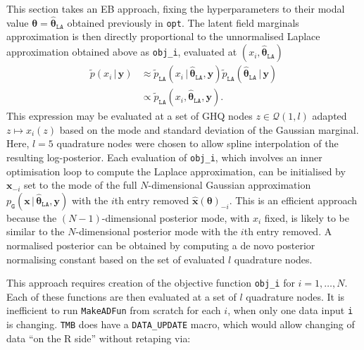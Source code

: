\documentclass[a4paper, nobind]{templates/ociamthesis}
\newenvironment{Shaded}{\begin{snugshade}}{\end{snugshade}}
\newcommand{\NormalTok}[1]{#1}
\newcommand{\OtherTok}[1]{\textcolor[rgb]{0.56,0.35,0.01}{#1}}
\newcommand{\SpecialCharTok}[1]{\textcolor[rgb]{0.81,0.36,0.00}{\textbf{#1}}}
\renewenvironment{Shaded}
{
  \vspace{10pt}%
  \begin{snugshade}%
}{%
  \end{snugshade}%
  \vspace{8pt}%
}
\begin{document}
This section takes an EB approach, fixing the hyperparameters to their modal value \(\boldsymbol{\mathbf{\theta}} = \hat{\boldsymbol{\mathbf{\theta}}}_\texttt{LA}\) obtained previously in \texttt{opt}.
The latent field marginals approximation is then directly proportional to the unnormalised Laplace approximation obtained above as \texttt{obj\_i}, evaluated at \((x_i, \hat{\boldsymbol{\mathbf{\theta}}}_\texttt{LA})\)
\begin{align}
\tilde p(x_i \, | \, \mathbf{y}) &\approx \tilde p_\texttt{LA}(x_i \, | \, \hat{\boldsymbol{\mathbf{\theta}}}_\texttt{LA}, \mathbf{y}) \tilde p_\texttt{LA}(\hat{\boldsymbol{\mathbf{\theta}}}_\texttt{LA} \, | \, \mathbf{y}) \\
&\propto \tilde p_\texttt{LA}(x_i, \hat{\boldsymbol{\mathbf{\theta}}}_\texttt{LA}, \mathbf{y}).
\end{align}
This expression may be evaluated at a set of GHQ nodes \(z \in \mathcal{Q}(1, l)\) adapted \(z \mapsto x_i(z)\) based on the mode and standard deviation of the Gaussian marginal.
Here, \(l = 5\) quadrature nodes were chosen to allow spline interpolation of the resulting log-posterior.
Each evaluation of \texttt{obj\_i}, which involves an inner optimisation loop to compute the Laplace approximation, can be initialised by \(\mathbf{x}_{-i}\) set to the mode of the full \(N\)-dimensional Gaussian approximation \(p_\texttt{G}(\mathbf{x} \, | \, \hat{\boldsymbol{\mathbf{\theta}}}_\texttt{LA}, \mathbf{y})\) with the \(i\)th entry removed \(\hat{\mathbf{x}}(\boldsymbol{\mathbf{\theta}})_{-i}\).
This is an efficient approach because the \((N - 1)\)-dimensional posterior mode, with \(x_i\) fixed, is likely to be similar to the \(N\)-dimensional posterior mode with the \(i\)th entry removed.
A normalised posterior can be obtained by computing a de novo posterior normalising constant based on the set of evaluated \(l\) quadrature nodes.

This approach requires creation of the objective function \texttt{obj\_i} for \(i = 1, \ldots, N\).
Each of these functions are then evaluated at a set of \(l\) quadrature nodes.
It is inefficient to run \texttt{MakeADFun} from scratch for each \(i\), when only one data input \texttt{i} is changing.
\texttt{TMB} does have a \texttt{DATA\_UPDATE} macro, which would allow changing of data ``on the R side'' without retaping via:

\begin{Shaded}
\end{Shaded}
\end{document}
